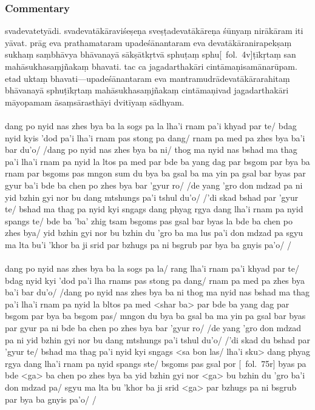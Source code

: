 \documentclass[12pt]{article}
\newcommand{\emdash} {\hspace{0em}—\hspace{0em}}
\begin{document}
\subsubsection{Commentary}
svadevatetyādi.
svadevatākāraviśeṣeṇa\footnoteB{
	svadevatā°] \sigmareading{\TVA}; lha \TVA\ (devatā°)
} sveṣṭadevatākāreṇa śūnyaṃ nirākāram iti yāvat.
prāg eva prathamataram\footnoteB{
	prathamataram] \MS ; prathamataro° \EDD
} upadeśānantaram\footnoteB{
	upadeśānantaram] \EDD\ (\emd); upadeśāntaram \MS
} eva devatākāranirapekṣaṃ sukhaṃ saṃbhāvya bhāvanayā sākṣātkṛtvā sphuṭaṃ\footnoteB{
	sphuṭaṃ] \MS ; \emph{deest in} \EDD ; ma gsal ba TIB 
} sphu[\MS\ fol.\ 4v]\hspace{0em}ṭīkṛtaṃ san mahāsukhasaṃjñakaṃ bhavati.
tac ca jagadarthakāri cintāmaṇisamānarūpam.
etad uktaṃ bhavati\emdash upadeśānantaram eva mantramudrādevatākārarahitaṃ\footnoteB{
	°rahitaṃ] \sigmareading{\TVA}; spangs te/ bde ba 'ba' zhig tsam \TVA\ (°rahitaṃ sukhamātraṃ)
} bhāvanayā sphuṭīkṛtaṃ mahāsukhasaṃjñakaṃ cintāmaṇivad jagadarthakāri māyopamam āsaṃsārasthāyi dvitīyaṃ sādhyam.\\

\textbf{\TVA}\\
dang po nyid nas zhes bya ba la sogs pa la lha'i rnam pa'i khyad par te/ bdag nyid kyis 'dod pa'i lha'i rnam pas stong pa dang/ rnam pa med pa zhes bya ba'i bar du'o/ /dang po nyid nas zhes bya ba ni/ thog ma nyid nas bshad ma thag pa'i lha'i rnam pa nyid la ltos pa med par bde ba yang dag par bsgom par bya ba rnam par bsgoms pas mngon sum du bya ba gsal ba ma yin pa gsal bar byas par gyur ba'i bde ba chen po zhes bya bar 'gyur ro/ /de yang 'gro don mdzad pa ni yid bzhin gyi nor bu dang mtshungs pa'i tshul du'o/ /'di skad bshad par 'gyur te/ bshad ma thag pa nyid kyi sngags dang phyag rgya dang lha'i rnam pa nyid spangs te/ bde ba 'ba' zhig tsam bsgoms pas gsal bar byas la bde ba chen po zhes bya/ yid bzhin gyi nor bu bzhin du 'gro ba ma lus pa'i don mdzad pa sgyu ma lta bu'i 'khor ba ji srid par bzhugs pa ni bsgrub par bya ba gnyis pa'o/ /\\

\textbf{\TVB}\\
dang po nyid nas zhes bya ba la sogs pa la/ rang lha'i rnam pa'i khyad par te/ bdag nyid kyi 'dod pa'i lha rnams pas stong pa dang/ rnam pa med pa zhes bya ba'i bar du'o/ /dang po nyid nas zhes bya ba ni thog ma nyid nas bshad ma thag pa'i lha'i rnam pa nyid la bltos pa med <shar ba> par bde ba yang dag par bsgom par bya ba bsgom pas/ mngon du bya ba gsal ba ma yin pa gsal bar byas par gyur pa ni bde ba chen po zhes bya bar 'gyur ro/ /de yang 'gro don mdzad pa ni yid bzhin gyi nor bu dang mtshungs pa'i tshul du'o/ /'di skad du bshad par 'gyur te/ bshad ma thag pa'i nyid kyi sngags <sa bon las/ lha'i sku> dang phyag rgya dang lha'i rnam pa nyid spangs ste/ bsgoms pas gsal por [\TVB\ fol.\ 75r] byas pa bde <ga> ba chen po zhes bya ba yid bzhin gyi nor <ga> bu bzhin du 'gro ba'i don mdzad pa/ sgyu ma lta bu 'khor ba ji srid <ga> par bzhugs pa ni bsgrub par bya ba gnyis pa'o/ /
\end{document}
